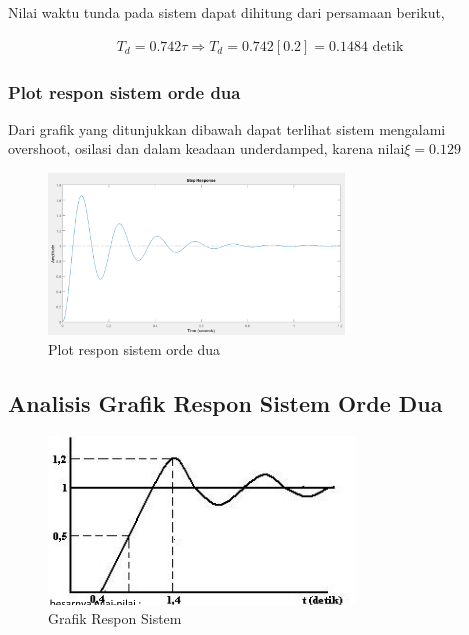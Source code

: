 \documentclass[../laporan]{subfiles}
\begin{document}
Nilai waktu tunda pada sistem dapat dihitung dari persamaan berikut,

\begin{equation}
    \begin{split}
        T_d = 0.742\tau \Rightarrow T_d = 0.742[0.2] = 0.1484 \text{ detik}
    \end{split}
\end{equation}

\subsubsection{Plot respon sistem orde dua}

Dari grafik yang ditunjukkan dibawah dapat terlihat sistem mengalami overshoot, osilasi dan dalam keadaan underdamped, karena nilai$ \xi = 0.129 $

\begin{figure}[H]
    \centering
    \includegraphics[width = 0.7\textwidth]{figure/plot_orde_dua.png}
    \caption{Plot respon sistem orde dua}
\end{figure}

\subsection{Analisis Grafik Respon Sistem Orde Dua}

\begin{figure}[H]
    \centering
    \includegraphics{figure/soal_5.png}
    \caption{Grafik Respon Sistem}
    \label{grafik_respon_sistem}
\end{figure}
\end{document}
